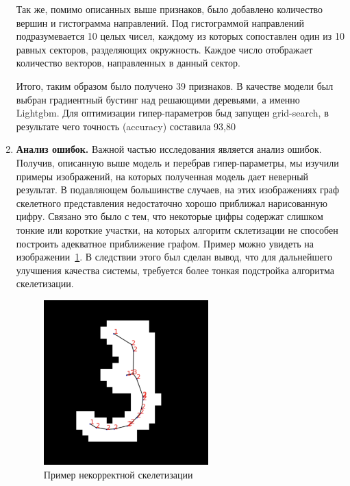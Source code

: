 \documentclass[12pt, twoside]{article}
\begin{document}
\begin{enumerate}
 Так же, помимо описанных выше признаков, было добавлено количество вершин и гистограмма направлений. Под гистограммой направлений подразумевается 10 целых чисел, каждому из которых сопоставлен один из 10 равных секторов, разделяющих окружность. Каждое число отображает количество векторов, направленных в данный сектор.
 
Итого, таким образом было получено 39 признаков. В качестве модели был выбран градиентный бустинг над решающими деревьями, а именно Lightgbm. Для оптимизации гипер-параметров быд запущен grid-search, в результате чего точность (accuracy) составила 93,80%
 
 
 \item  \textbf{Анализ ошибок.}
 Важной частью исследования является анализ ошибок. Получив, описанную выше модель и перебрав гипер-параметры, мы изучили примеры изображений, на которых полученная модель дает неверный результат. В подавляющем большинстве случаев, на этих изображениях граф скелетного представления недостаточно хорошо приближал нарисованную цифру. Связано это было с тем, что некоторые цифры содержат слишком тонкие или короткие участки, на которых алгоритм склетизации не способен построить адекватное приближение графом. Пример можно увидеть на изображении~\ref{fig:bad_sample}. В следствии этого был сделан вывод, что для дальнейшего улучшения качества системы, требуется более тонкая подстройка алгоритма скелетизации.
 
 \begin{figure}[H]
	\begin{center}
 		\includegraphics[width=0.6\textwidth]{bad_sample.jpg}
 	\end{center}
  \caption{Пример некорректной скелетизации}
  \label{fig:bad_sample}
\end{figure}

 \end{enumerate}
\end{document}
